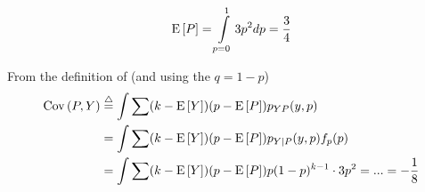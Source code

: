 \documentclass[a4paper,twoside=false,abstract=false,numbers=noenddot,
titlepage=false,headings=small,parskip=half,version=last]{scrartcl}
\begin{document}
\begin{solution}
    \begin{equation}
        {\rm E}\,[P] = \int\limits_{p=0}^1 3p^2dp = \frac{3}{4}
    \end{equation}

    From the definition of \CoVariance  (and using the $q = 1-p$)
    \begin{align}
        \CoVariance(P, Y) & \eqdef 
            \int\sum (k - \Expected[Y])(p - \Expected[P]) p_{YP}(y, p)%
            \nonumber \\& =
            \int\sum (k - \Expected[Y])(p - \Expected[P]) p_{Y|P}(y, p)f_p(p)%
            \nonumber \\& =
             \int\sum (k - \Expected[Y])(p - \Expected[P]) p(1-p)^{k-1} \cdot
             3p^2
        = ... = %
        -\frac{1}{8}
    \end{align}

\end{solution}
\pagebreak

\end{document}
